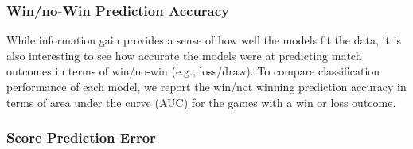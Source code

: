 \documentclass[runningheads,a4paper]{llncs}
\begin{document}
\subsubsection{Win/no-Win Prediction Accuracy}
\label{sec:WLPredictionAccuracy}

While information gain provides a sense of how well the models fit the
data, it is also interesting to see how accurate the models were at
predicting match outcomes in terms of win/no-win (e.g., loss/draw).  To compare
classification performance of each model, we report the
win/not winning prediction accuracy in terms of area under the curve (AUC) for the
games with a win or loss outcome.



\subsubsection{Score Prediction Error}
\label{sec:scorePredictionError}
\end{document}
